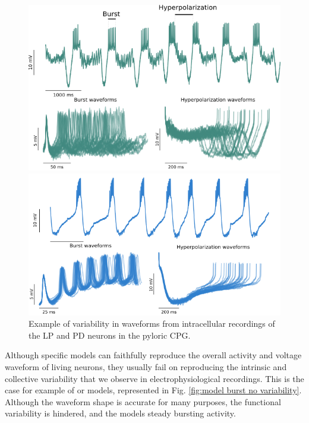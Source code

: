 \begin{figure}[hbt]
	\centering
	\begin{minipage}{0.48\textwidth}
		\includegraphics[width=\textwidth]{img/invariants/variability/lp_burst_variability.png}
	\end{minipage}
	\begin{minipage}{0.48\textwidth}
		\includegraphics[width=\textwidth]{img/invariants/variability/pd_burst_variability.png}
	\end{minipage}
	\caption{Example of variability in waveforms from intracellular recordings of the LP and PD neurons in the pyloric CPG.}
	\label{fig:lp-pd burst variability}
\end{figure}

Although specific models can faithfully reproduce the overall activity and voltage waveform  of living neurons, they usually fail on reproducing the intrinsic and collective variability that we observe in electrophysiological recordings. This is the case for example of \textcite{ghigliazza_minimal_2004b} or \textcite{vavoulis_dynamic_2007} models, represented in Fig. \ref{fig:model burst no variability}. Although the waveform shape is accurate for many purposes, the functional variability is hindered, and the models steady bursting activity. 

